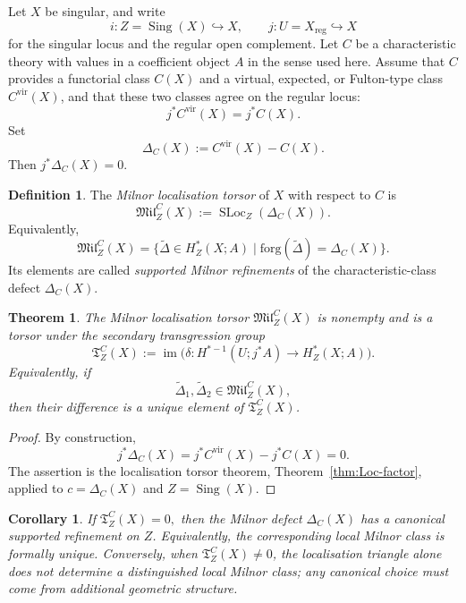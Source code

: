 \documentclass[10pt,a4paper,dvipsnames,x11names]{amsart}
\newcommand{\forg}{\mathrm{forg}}
\newcommand{\SLoc}{\operatorname{SLoc}}
\newcommand{\TLoc}{\mathfrak T}
\numberwithin{equation}{section}
\theoremstyle{plain}
\newtheorem{theorem}{Theorem}[section]
\newtheorem{corollary}[corollary]{Corollary}
\theoremstyle{definition}
\newtheorem{definition}[definition]{Definition}
\theoremstyle{remark}
\begin{document}
Let $X$ be singular, and write
\[
i:Z=\operatorname{Sing}(X)\hookrightarrow X,
\qquad
j:U=X_{\mathrm{reg}}\hookrightarrow X
\]
for the singular locus and the regular open complement.  Let $C$ be a characteristic theory with values in a coefficient object $A$ in the sense used here.  Assume that $C$ provides a functorial class $C(X)$ and a virtual, expected, or Fulton-type class $C^{\mathrm{vir}}(X)$, and that these two classes agree on the regular locus:
\[
j^*C^{\mathrm{vir}}(X)=j^*C(X).
\]
Set
\[
\Delta_C(X):=C^{\mathrm{vir}}(X)-C(X).
\]
Then $j^*\Delta_C(X)=0$.

\begin{definition}\label{def:milnor-localization-torsor}
The \emph{Milnor localisation torsor} of $X$ with respect to $C$ is
\[
\mathfrak{Mil}^C_Z(X)
:=
\SLoc_Z(\Delta_C(X)).
\]
Equivalently,
\[
\mathfrak{Mil}^C_Z(X)
=
\{\widetilde\Delta\in H^*_Z(X;A)
\mid
\forg(\widetilde\Delta)=\Delta_C(X)\}.
\]
Its elements are called \emph{supported Milnor refinements} of the characteristic-class defect $\Delta_C(X)$.
\end{definition}


\begin{theorem}\label{thm:milnor-ambiguity-torsor}
The Milnor localisation torsor $\mathfrak{Mil}^C_Z(X)$ is nonempty and is a torsor under the secondary transgression group
\[
\TLoc^C_Z(X)
:=
\operatorname{im}\bigl(
\delta:H^{*-1}(U;j^*A)\to H^*_Z(X;A)
\bigr).
\]
Equivalently, if
\[
\widetilde\Delta_1,\widetilde\Delta_2
\in
\mathfrak{Mil}^C_Z(X),
\]
then their difference is a unique element of $\TLoc^C_Z(X)$.
\end{theorem}

\begin{proof}
By construction,
\[
j^*\Delta_C(X)=j^*C^{\mathrm{vir}}(X)-j^*C(X)=0.
\]
The assertion is the localisation torsor theorem, Theorem~\ref{thm:Loc-factor}, applied to $c=\Delta_C(X)$ and $Z=\operatorname{Sing}(X)$.
\end{proof}

\begin{corollary}\label{cor:milnor-canonical}
If
$
\TLoc^C_Z(X)=0,
$
then the Milnor defect $\Delta_C(X)$ has a canonical supported refinement on $Z$.  Equivalently, the corresponding local Milnor class is formally unique.
Conversely, when $\TLoc^C_Z(X)\neq 0$, the localisation triangle alone does not determine a distinguished local Milnor class; any canonical choice must come from additional geometric structure.
\end{corollary}
\end{document}

